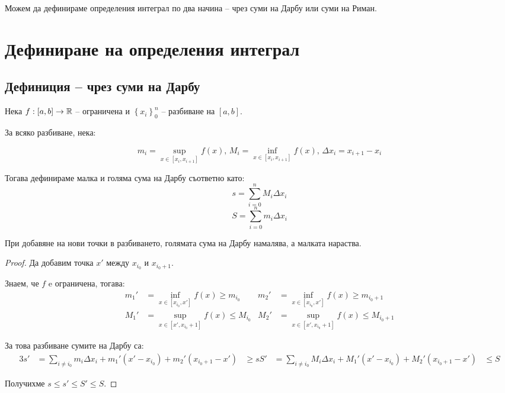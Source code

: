 
Можем да дефинираме определения интеграл по два начина -- чрез суми на Дарбу или суми на Риман.

\section{Дефиниране на определения интеграл}

\subsection{Дефиниция -- чрез суми на Дарбу}
\begin{definition}
    Нека $f: [a,b] \to \mathbb{R}$ -- ограничена и $\left\{x_i\right\}_0^{n}$ -- разбиване на $[a,b]$.

    За всяко разбиване, нека:

    \[m_i = \sup_{x \in [x_i,x_{i+1}]} f(x),\, M_i = \inf_{x \in [x_i,x_{i+1}]} f(x),\,\Delta{x_i} = x_{i+1} - x_i\]

    Тогава дефинираме малка и голяма сума на Дарбу съответно като:
    \[s = \sum_{i=0}^n M_i \Delta x_i\]
    \[S = \sum_{i=0}^n m_i\Delta x_i\]
\end{definition}

\begin{theorem}
    При добавяне на нови точки в разбиването, голямата сума на Дарбу намалява, а малката нараства.

    \begin{proof}
        Да добавим точка $x'$ между $x_{i_0}$ и $x_{i_0+1}$.

        Знаем, че $f$ e ограничена, тогава:
        \begin{align*}
            m_1' & = \inf_{x\in[x_{i_0},x']} f(x)   \geq m_{i_0}   &
            m_2' & = \inf_{x\in[x_{i_0},x']} f(x)   \geq m_{i_0+1}   \\
            M_1' & = \sup_{x\in[x',x_{i_0}+1]} f(x) \leq M_{i_0}   &
            M_2' & = \sup_{x\in[x',x_{i_0}+1]} f(x) \leq M_{i_0+1}
        \end{align*}

        За това разбиване сумите на Дарбу са:
        \begin{alignat*}{3}
            s' & = \sum_{i\neq i_0}m_i\Delta x_i + m_1'(x'-x_{i_0}) + m_2' (x_{i_0+1}-x') & \geq s
            S' & = \sum_{i\neq i_0}M_i\Delta x_i + M_1'(x'-x_{i_0}) + M_2' (x_{i_0+1}-x') & \leq S
        \end{alignat*}

        Получихме $s \leq s' \leq S' \leq S$.
    \end{proof}
\end{theorem}

